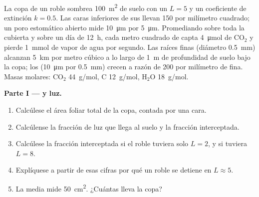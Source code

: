 \begin{problem}
\label{pb:b1:flowering-plant-organization:1}
La copa de un roble sombrea \qty{100}{m^2} de suelo con un  $L = 5$ y un coeficiente de extinción $k = 0.5$. Las caras inferiores
de sus  llevan \qty{150}{}  por milímetro cuadrado; un poro
estomático abierto mide \qty{10}{\micro m} por \qty{5}{\micro m}.
Promediando sobre toda la cubierta y sobre un día de \qty{12}{h}, cada metro
cuadrado de  capta \qty{4}{\micro mol} de $\mathrm{CO_2}$ y pierde
\qty{1}{mmol} de vapor de agua por segundo. Las raíces finas (diámetro
\qty{0.5}{mm}) alcanzan \qty{5}{km} por metro cúbico a lo largo de
\qty{1}{m} de profundidad de suelo bajo la copa; los 
(\qty{10}{\micro m} por \qty{0.5}{mm}) crecen a razón de \qty{200}{} por
milímetro de  fina. Masas molares: $\mathrm{CO_2}$ \qty{44}{g/mol}, C
\qty{12}{g/mol}, $\mathrm{H_2O}$ \qty{18}{g/mol}.

\medskip
\noindent\textbf{Parte I ---  y luz.}
\begin{enumerate}
  \item Calcúlese el área foliar total de la copa, contada por una cara.
  \item Calcúlense la fracción de luz que llega al suelo y la fracción
        interceptada.
  \item Calcúlese la fracción interceptada si el roble tuviera solo
        $L = 2$, y si tuviera $L = 8$.
  \item Explíquese a partir de esas cifras por qué un roble se detiene en
        $L \approx 5$.
  \item La  media mide \qty{50}{cm^2}. ¿Cuántas  lleva la copa?
\end{enumerate}


\end{problem}
